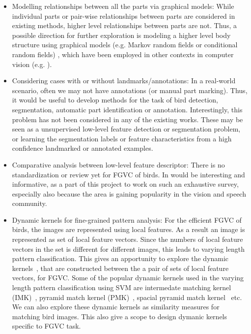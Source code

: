\documentclass{article}
\begin{document}
\begin{itemize}
\item Modelling relationships between all the parts via graphical models: While
individual parts or pair-wise relationships between parts are considered in
existing methods, higher level relationships between parts are not.
Thus, a possible direction for further exploration is modeling a higher level
body structure using graphical models (e.g. Markov random fields or conditional
random fields) \cite{mrfbook,hmrf,mrf,crf,crf1}, which have been employed in 
other contexts in computer vision (e.g. \cite{mrfpose}). 

\item Considering cases with or without landmarks/annotations: In a real-world
scenario, often we may not have annotations (or manual part marking). Thus, it
would be useful to develop methods for the task of bird detection, segmentation,  
automatic part identification or annotation. Interestingly, this problem has not been considered in any of the
existing works. These may be seen as a unsupervised low-level feature detection
or segmentation problem, or learning the segmentation labels or feature
characteristics from a high confidence landmarked or annotated examples.

\item Comparative analysis between low-level feature descriptor: There is no
standardization or review yet for FGVC of birds. In would be interesting and
informative, as a part of this project to work on such an exhaustive survey,
especially also because the area is gaining popularity in the vision and speech
community.

\item Dynamic kernels for fine-grained pattern analysis: For the efficient FGVC of birds, the images are represented using local features. As a result an image is represented as set of local feature vectors. Since the numbers of local feature vectors in
the set is different for different images, this leads to varying length pattern
classification. This gives an apportunity to explore the dynamic kernels~\cite{DK_2003_MK_Wallraven}, that are constructed between the a pair of sets of local feature vectors, for FGVC. Some of the popular dynamic kernels used in the varying length pattern classification using SVM are intermedate matching kernel (IMK)~\cite{IMK_2014_DAD_CC}, pyramid match kernel (PMK)~\cite{PMK_2007_Grauman}, spacial pyramid match kernel~\cite{SPMK_2006_Lazebnik} etc. We can also explore these dynamic kernels as similarity measures for matching bird images. This also give a scope to design dymanic kernels specific to FGVC task. 
\end{itemize}
\end{document}

